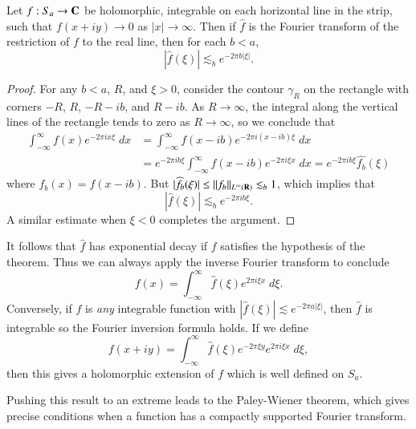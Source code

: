 \begin{theorem}
    Let $f: S_a \to \operatorname{\mathbf{C}}$ be holomorphic, integrable on each horizontal line in the strip, such that $f(x + iy) \to 0$ as $|x| \to \infty$. Then if $\widehat{f}$ is the Fourier transform of the restriction of $f$ to the real line, then for each $b < a$,
    \[ |\widehat{f}(\xi)| \lesssim_b e^{-2 \pi b |\xi|}. \]
\end{theorem}
\begin{proof}
    For any $b < a$, $R$, and $\xi > 0$, consider the contour $\gamma_R$ on the rectangle with corners $-R$, $R$, $-R-ib$, and $R-ib$. As $R \to \infty$, the integral along the vertical lines of the rectangle tends to zero as $R \to \infty$, so we conclude that
    \begin{align*}
        \int_{-\infty}^\infty f(x)e^{-2\pi i x \xi}\; dx &= \int_{-\infty}^\infty f(x-ib)e^{- 2 \pi i (x - ib) \xi}\; dx\\
        &= e^{-2 \pi i b \xi} \int_{-\infty}^\infty f(x-ib) e^{- 2 \pi i \xi x}\; dx = e^{-2 \pi i b \xi} \widehat{f_b}(\xi)
    \end{align*}
    where $f_b(x) = f(x - ib)$. But $|\widehat{f_b}(\xi)| \leq \| f_b \|_{L^\infty(\operatorname{\mathbf{R}})} \lesssim_b 1$, which implies that
    \[ |\widehat{f}(\xi)| \lesssim_b e^{-2 \pi i b \xi}. \]
    A similar estimate when $\xi < 0$ completes the argument.
\end{proof}

It follows that $\widehat{f}$ has exponential decay if $f$ satisfies the hypothesis of the theorem. Thus we can always apply the inverse Fourier transform to conclude
%
\[ f(x) = \int_{-\infty}^\infty \widehat{f}(\xi) e^{2 \pi i \xi x}\; d\xi. \]
%
Conversely, if $f$ is \emph{any} integrable function with $|\widehat{f}(\xi)| \lesssim e^{-2 \pi a |\xi|}$, then $\widehat{f}$ is integrable so the Fourier inversion formula holds. If we define
%
\[ f(x + iy) = \int_{-\infty}^\infty \widehat{f}(\xi) e^{-2 \pi \xi y} e^{2 \pi i \xi x}\; d\xi, \]
%
then this gives a holomorphic extension of $f$ which is well defined on $S_a$.

Pushing this result to an extreme leads to the Paley-Wiener theorem, which gives precise conditions when a function has a compactly supported Fourier transform.

